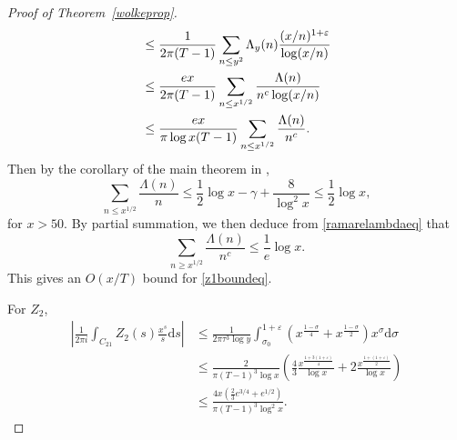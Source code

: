 \documentclass[reqno]{amsart}
\numberwithin{equation}{section}
\theoremstyle{remark}
\begin{document}
\begin{proof}[Proof of Theorem~\ref{wolkeprop}]
\begin{align}
    &\leq\frac{1}{2\pi(T-1)}\sum_{n\leq y^2}\Lambda_y(n)\frac{(x/n)^{1+\varepsilon}}{\log(x/n)}\notag\\
    &\leq\frac{ex}{2\pi(T-1)}\sum_{n\leq x^{1/2}}\frac{\Lambda(n)}{n^c\log(x/n)}\notag\\
    &\leq\frac{ex}{\pi\log x(T-1)}\sum_{n\leq x^{1/2}}\frac{\Lambda(n)}{n^c}.
\end{align}
Then by the corollary of the main theorem in \cite{Ramare_2013},
\begin{equation}\label{ramarelambdaeq}
    \sum_{n\leq x^{1/2}}\frac{\Lambda(n)}{n}\leq \frac{1}{2}\log x-\gamma+\frac{8}{\log^2x}\leq\frac{1}{2}\log x,
\end{equation}
for $x>50$. By partial summation, we then deduce from \eqref{ramarelambdaeq} that
\begin{equation*}
    \sum_{n\geq x^{1/2}}\frac{\Lambda(n)}{n^c}\leq\frac{1}{e}\log x.
\end{equation*}
This gives an $O(x/T)$ bound for \eqref{z1boundeq}.

For $Z_2$,
\begin{align*}
    \left|\frac{1}{2\pi i}\int_{C_{21}}Z_2(s)\frac{x^s}{s}\mathrm{d}s\right|&\leq\frac{1}{2\pi\tau^3\log y}\int_{\sigma_0}^{1+\varepsilon}(x^{\frac{1-\sigma}{4}}+x^{\frac{1-\sigma}{2}})x^\sigma\mathrm{d}\sigma\\
    &\leq\frac{2}{\pi(T-1)^3\log x}\left(\frac{4}{3}\frac{x^{\frac{1+3(1+\varepsilon)}{4}}}{\log x}+2\frac{x^{\frac{1+(1+\varepsilon)}{2}}}{\log x}\right)\\
    &\leq\frac{4x\left(\frac{2}{3}e^{3/4}+e^{1/2}\right)}{\pi(T-1)^3\log^2x}.
\end{align*}


\end{proof}
\end{document}
